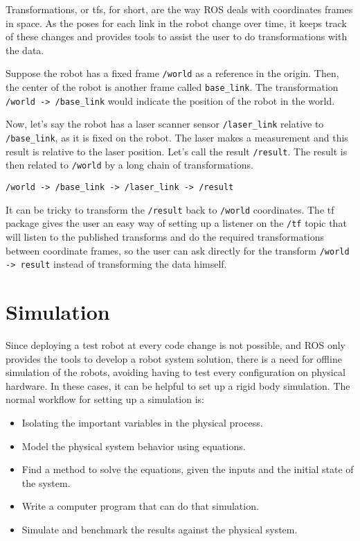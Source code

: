 Transformations, or tfs, for short, are the way ROS deals with coordinates frames in space. As the poses for each link in the robot change over time, it keeps track of these changes and provides tools to assist the user to do transformations with the data.

Suppose the robot has a fixed frame \texttt{/world} as a reference in the origin. Then, the center of the robot is another frame called \texttt{base\_link}. The transformation \texttt{/world -> /base\_link} would indicate the position of the robot in the world.

Now, let's say the robot has a laser scanner sensor \texttt{/laser\_link} relative to \texttt{/base\_link}, as it is fixed on the robot. The laser makes a measurement and this result is relative to the laser position. Let's call the result \texttt{/result}. The result is then related to \texttt{/world} by a long chain of transformations.

\begin{verbatim}
/world -> /base_link -> /laser_link -> /result
\end{verbatim}

It can be tricky to transform the \texttt{/result} back to \texttt{/world} coordinates. The tf package gives the user an easy way of setting up a listener on the \texttt{/tf} topic that will listen to the published transforms and do the required transformations between coordinate frames, so the user can ask directly for the transform \texttt{/world -> result} instead of transforming the data himself.

\section{Simulation}

Since deploying a test robot at every code change is not possible, and ROS only provides the tools to develop a robot system solution, there is a need for offline simulation of the robots, avoiding having to test every configuration on physical hardware. In these cases, it can be helpful to set up a rigid body simulation. The normal workflow for setting up a simulation is:

\begin{itemize}
    \item Isolating the important variables in the physical process.
    \item Model the physical system behavior using equations.
    \item Find a method to solve the equations, given the inputs and the initial state of the system.
    \item Write a computer program that can do that simulation.
    \item Simulate and benchmark the results against the physical system.
\end{itemize}

